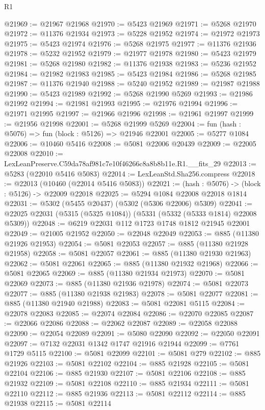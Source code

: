 \begin{lexlean}{R1}
\begin{coremodule}
@21969 := @21967 @21968
@21970 := @5423 @21969
@21971 := @5268 @21970
@21972 := @11376 @21934
@21973 := @5228 @21952
@21974 := @21972 @21973
@21975 := @5423 @21974
@21976 := @5268 @21975
@21977 := @11376 @21936
@21978 := @5232 @21952
@21979 := @21977 @21978
@21980 := @5423 @21979
@21981 := @5268 @21980
@21982 := @11376 @21938
@21983 := @5236 @21952
@21984 := @21982 @21983
@21985 := @5423 @21984
@21986 := @5268 @21985
@21987 := @11376 @21940
@21988 := @5240 @21952
@21989 := @21987 @21988
@21990 := @5423 @21989
@21992 := @5268 @21990 @5269
@21993 := @21986 @21992
@21994 := @21981 @21993
@21995 := @21976 @21994
@21996 := @21971 @21995
@21997 := @21966 @21996
@21998 := @21961 @21997
@21999 := @21956 @21998
@22001 := @5268 @21999 @5269
@22004 := fun (hash : @5076) => fun (block : @5126) => @21946 @22001
@22005 := @5277 @1084
@22006 := @10460 @5416
@22008 := @5081 @22006 @20439
@22009 := @22005 @22008
@22010 := LexLeanPreserve.C59da78af981c7e10f46266c8a8b8b11e.R1.__fits_29
@22013 := @5283 (@22010 @5416 @5083)
@22014 := LexLeanStd.Sha256.compress
@22018 := @22013 (@10460 (@22014 @5416 @5083))
@22021 := (hash : @5076) -> (block : @5126) -> @22009 @22018
@22025 := @5294 @1084 @22008 @22018 @1814
@22031 := @5302 (@5455 @20437) (@5302 (@5306 @22006) @5309)
@22041 := @22025 @22031 (@5315 (@5325 @1084)) (@5331 (@5332 (@5333 @1814) @22008 @5309))
@22048 := @6219 @22031 @112 @1723 @1748 @1812 @21945 @22001
@22049 := @21005 @21952
@22050 := @22048 @22049
@22053 := @885 (@11380 @21926 @21953)
@22054 := @5081 @22053
@22057 := @885 (@11380 @21928 @21958)
@22058 := @5081 @22057
@22061 := @885 (@11380 @21930 @21963)
@22062 := @5081 @22061
@22065 := @885 (@11380 @21932 @21968)
@22066 := @5081 @22065
@22069 := @885 (@11380 @21934 @21973)
@22070 := @5081 @22069
@22073 := @885 (@11380 @21936 @21978)
@22074 := @5081 @22073
@22077 := @885 (@11380 @21938 @21983)
@22078 := @5081 @22077
@22081 := @885 (@11380 @21940 @21988)
@22083 := @5081 @22081 @5115
@22084 := @22078 @22083
@22085 := @22074 @22084
@22086 := @22070 @22085
@22087 := @22066 @22086
@22088 := @22062 @22087
@22089 := @22058 @22088
@22090 := @22054 @22089
@22091 := @5080 @22090
@22092 := @22050 @22091
@22097 := @7132 @22031 @1342 @1747 @21916 @21944
@22099 := @7761 @1729 @5115
@22100 := @5081 @22099
@22101 := @5081 @279
@22102 := @885 @21926
@22103 := @5081 @22102
@22104 := @885 @21928
@22105 := @5081 @22104
@22106 := @885 @21930
@22107 := @5081 @22106
@22108 := @885 @21932
@22109 := @5081 @22108
@22110 := @885 @21934
@22111 := @5081 @22110
@22112 := @885 @21936
@22113 := @5081 @22112
@22114 := @885 @21938
@22115 := @5081 @22114

\end{coremodule}
\end{lexlean}
